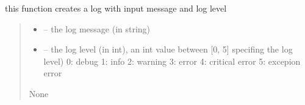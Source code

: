 \documentclass[letterpaper,10pt,english]{sphinxmanual}
\begin{document}
\begin{savenotes}
\begin{fulllineitems}
\begin{savenotes}
\begin{fulllineitems}
\begin{quote}
\begin{description}
\end{description}\end{quote}

\end{fulllineitems}\end{savenotes}


\begin{savenotes}\begin{fulllineitems}
\label{\detokenize{setting/backend/logging_funcs:oxin.backend.logging_funcs.app_logger.create_new_log}}
\pysigstartsignatures
{}
\pysigstopsignatures
\sphinxAtStartPar
this function creates a log with input message and log level
\begin{quote}\begin{description}
\begin{itemize}
\item {} 
\sphinxAtStartPar
{} – the log message (in string)

\item {} 
\sphinxAtStartPar
{} – the log level (in int), an int value between {[}0, 5{]} specifing the log level)
0: debug
1: info
2: warning
3: error
4: critical error
5: excepion error

\end{itemize}

\sphinxAtStartPar
None

\end{description}\end{quote}

\end{fulllineitems}\end{savenotes}



\end{fulllineitems}
\end{savenotes}
\end{document}
